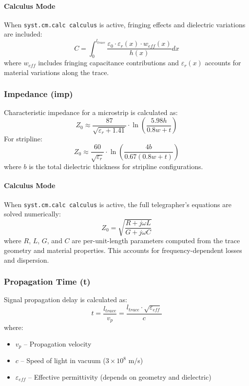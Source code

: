 \paragraph{Calculus Mode}
When \texttt{syst.cm.calc calculus} is active, fringing effects and dielectric variations are included:
\begin{equation}
C = \int_0^{l_{trace}} \frac{\varepsilon_0 \cdot \varepsilon_r(x) \cdot w_{eff}(x)}{h(x)} dx
\end{equation}
where $w_{eff}$ includes fringing capacitance contributions and $\varepsilon_r(x)$ accounts for material variations along the trace.

\subsubsection{Impedance (imp)}
Characteristic impedance for a microstrip is calculated as:
\begin{equation}
Z_0 \approx \frac{87}{\sqrt{\varepsilon_r + 1.41}} \cdot \ln\left(\frac{5.98h}{0.8w + t}\right)
\end{equation}
For stripline:
\begin{equation}
Z_0 \approx \frac{60}{\sqrt{\varepsilon_r}} \cdot \ln\left(\frac{4b}{0.67(0.8w + t)}\right)
\end{equation}
where $b$ is the total dielectric thickness for stripline configurations.

\paragraph{Calculus Mode}
When \texttt{syst.cm.calc calculus} is active, the full telegrapher's equations are solved numerically:
\begin{equation}
Z_0 = \sqrt{\frac{R + j\omega L}{G + j\omega C}}
\end{equation}
where $R$, $L$, $G$, and $C$ are per-unit-length parameters computed from the trace geometry and material properties. This accounts for frequency-dependent losses and dispersion.

\subsubsection{Propagation Time (t)}
Signal propagation delay is calculated as:
\begin{equation}
t = \frac{l_{trace}}{v_p} = \frac{l_{trace} \cdot \sqrt{\varepsilon_{eff}}}{c}
\end{equation}
where:
\begin{itemize}
\item $v_p$ -- Propagation velocity
\item $c$ -- Speed of light in vacuum ($3 \times 10^8$ m/s)
\item $\varepsilon_{eff}$ -- Effective permittivity (depends on geometry and dielectric)
\end{itemize}

